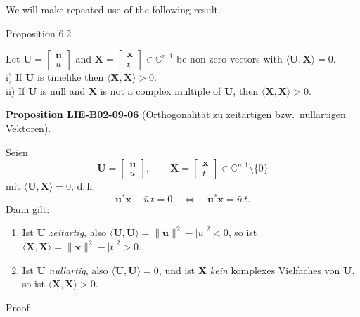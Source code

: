 \documentclass[10pt, letterpaper]{article}
\newcommand{\CustomHeading}[3]{%
  \par\medskip\noindent%
  \textbf{#1 #2} \textnormal{(#3)}.\enskip%
}
\newenvironment{PROP}[2]{\begin{unitbox}\CustomHeading{Proposition}{#1}{#2}}{\end{unitbox}}
\begin{document}
We will make repeated use of the following result.




Proposition 6.2


Let $\mathbf{U}=\left[\begin{array}{l}\mathbf{u} \\ u\end{array}\right]$ and $\mathbf{X}=\left[\begin{array}{l}\mathbf{x} \\ t\end{array}\right] \in \mathbb{C}^{n, 1}$ be non-zero vectors with $\langle\mathbf{U}, \mathbf{X}\rangle=0$.\\
i) If $\mathbf{U}$ is timelike then $\langle\mathbf{X}, \mathbf{X}\rangle>0$.\\
ii) If $\mathbf{U}$ is null and $\mathbf{X}$ is not a complex multiple of $\mathbf{U}$, then $\langle\mathbf{X}, \mathbf{X}\rangle>0$.



\begin{PROP}{LIE-B02-09-06}{Orthogonalität zu zeitartigen bzw.\ nullartigen Vektoren}
Seien
\[
\mathbf{U}=
\begin{bmatrix}\mathbf{u}\\ u\end{bmatrix},
\qquad
\mathbf{X}=
\begin{bmatrix}\mathbf{x}\\ t\end{bmatrix}
\in \mathbb{C}^{n,1}\setminus\{0\}
\]
mit $\langle \mathbf{U},\mathbf{X}\rangle=0$, d.\,h.
\[
\mathbf{u}^*\mathbf{x}-\bar u\,t=0\quad\Longleftrightarrow\quad
\mathbf{u}^*\mathbf{x}=\bar u\,t.
\]
Dann gilt:
\begin{enumerate}\itemsep0.3em
\item[(i)] Ist $\mathbf{U}$ \emph{zeitartig}, also $\langle \mathbf{U},\mathbf{U}\rangle
= \|\mathbf{u}\|^2-|u|^2<0$, so ist $\langle \mathbf{X},\mathbf{X}\rangle
=\|\mathbf{x}\|^2-|t|^2>0$.
\item[(ii)] Ist $\mathbf{U}$ \emph{nullartig}, also $\langle \mathbf{U},\mathbf{U}\rangle
=0$, und ist $\mathbf{X}$ \emph{kein} komplexes Vielfaches von $\mathbf{U}$, so ist
$\langle \mathbf{X},\mathbf{X}\rangle>0$.
\end{enumerate}
\end{PROP}


Proof
\end{document}
